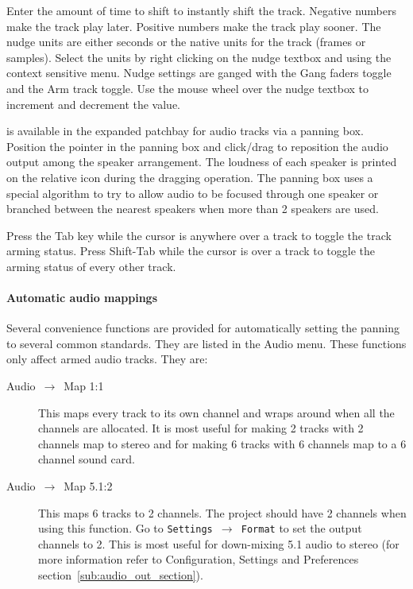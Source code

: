 \begin{description}
  Enter the amount of time to shift to instantly shift the
  track. Negative numbers make the track play later. Positive numbers
  make the track play sooner. The nudge units are either seconds or
  the native units for the track (frames or samples). Select the units
  by right clicking on the nudge textbox and using the context
  sensitive menu. Nudge settings are ganged with the Gang faders
  toggle and the Arm track toggle. Use the mouse wheel over the nudge
  textbox to increment and decrement the value.
\item[Pan]  is available in the expanded patchbay for audio
  tracks via a panning box. Position the pointer in the panning box
  and click/drag to reposition the audio output among the speaker
  arrangement. The loudness of each speaker is printed on the relative
  icon during the dragging operation. The panning box uses a special
  algorithm to try to allow audio to be focused through one speaker or
  branched between the nearest speakers when more than 2 speakers are
  used.
\end{description}

Press the Tab key while the cursor is anywhere over a track to
toggle the track arming status. Press Shift-Tab while the cursor is
over a track to toggle the arming status of every other track.

\paragraph{Automatic audio mappings}  Several convenience functions
are provided for automatically setting the panning to several common
standards. They are listed in the Audio menu. These functions only
affect armed audio tracks. They are:

\begin{description}
\item[Audio~$\rightarrow$~Map 1:1]  This maps every track to
  its own channel and wraps around when all the channels are
  allocated. It is most useful for making 2 tracks with 2 channels map
  to stereo and for making 6 tracks with 6 channels map to a 6 channel
  sound card.
\item[Audio~$\rightarrow$~Map 5.1:2]  This maps 6 tracks to 2
  channels. The project should have 2 channels when using this
  function. Go to \texttt{Settings $\rightarrow$ Format} to set the
  output channels to 2. This is most useful for down-mixing 5.1 audio
  to stereo (for more information refer to Configuration, Settings and
  Preferences section~\ref{sub:audio_out_section}).
\end{description}

